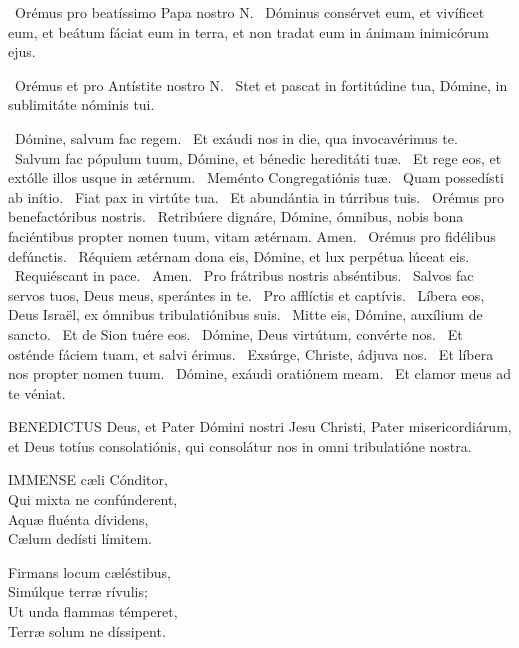 \V\ Orémus pro beatíssimo Papa nostro N. \R\ Dóminus consérvet eum, et vivíficet eum, et beátum fáciat eum in terra, et non tradat eum in ánimam inimicórum ejus.

\V\ Orémus et pro Antístite nostro N. \R\ Stet et pascat in fortitúdine tua, Dómine, in sublimitáte nóminis tui.

\V\ Dómine, salvum fac regem. \R\ Et exáudi nos in die, qua invocavérimus te. \V\ Salvum fac pópulum tuum, Dómine, et bénedic hereditáti tuæ. \R\ Et rege eos, et extólle illos usque in ætérnum. \V\ Meménto Congregatiónis tuæ. \R\ Quam possedísti ab inítio. \V\ Fiat pax in virtúte tua. \R\ Et abundántia in túrribus tuis. \V\ Orémus pro benefactóribus nostris. \R\ Retribúere dignáre, Dómine, ómnibus, nobis bona faciéntibus propter nomen tuum, vitam ætérnam. Amen. \V\ Orémus pro fidélibus defúnctis. \R\ Réquiem ætérnam dona eis, Dómine, et lux perpétua lúceat eis. \V\ Requiéscant in pace. \R\ Amen. \V\ Pro frátribus nostris abséntibus. \R\ Salvos fac servos tuos, Deus meus, sperántes in te. \V\ Pro afflíctis et captívis. \R\ Líbera eos, Deus Israël, ex ómnibus tribulatiónibus suis. \V\ Mitte eis, Dómine, auxílium de sancto. \R\ Et de Sion tuére eos. \V\ Dómine, Deus virtútum, convérte nos. \R\ Et osténde fáciem tuam, et salvi érimus. \V\ Exsúrge, Christe, ádjuva nos. \R\ Et líbera nos propter nomen tuum. \V\ Dómine, exáudi oratiónem meam. \R\ Et clamor meus ad te véniat.




\lettrine[lines=2]{B}{ENEDICTUS} Deus, et Pater Dómini nostri Jesu Christi, Pater misericordiárum, et Deus totíus consolatiónis, qui consolátur nos in omni tribulatióne nostra.


\lettrine[lines=2]{I}{MMENSE} cæli Cónditor,\\
Qui mixta ne confúnderent,\\
Aquæ fluénta dívidens,\\
Cælum dedísti límitem.

Firmans locum cæléstibus,\\
Simúlque terræ rívulis;\\
Ut unda flammas témperet,\\
Terræ solum ne díssipent.


